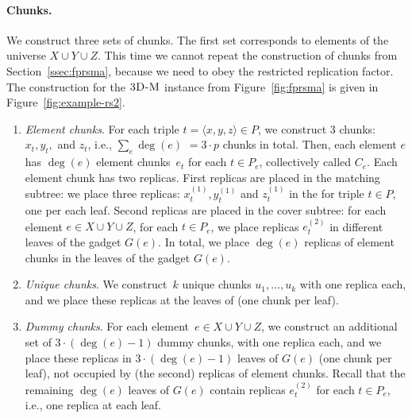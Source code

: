 \paragraph{Chunks.}
We construct three sets of chunks.
The first set corresponds to elements of the universe $X\cup Y\cup Z$.
This time we cannot repeat the construction of chunks from Section~\ref{ssec:fprsma}, because we need to obey the restricted replication factor.
The construction for the $\textsc{3D-M}$ instance from Figure~\ref{fig:fprsma} is given in Figure~\ref{fig:example-rs2}.
\begin{enumerate}
  \item \emph{Element chunks}. For each triple $t = \langle x, y, z \rangle \in P$, we construct $3$ chunks:~$x_t, y_t,$ and $z_t$, i.e., $\sum_e\deg(e)$ $=3\cdot p$ chunks in total.
  Then, each element $e$ has $\deg(e)$ element chunks~$e_t$ for each $t \in P_e$,  collectively called $C_e$.
  Each element chunk has two replicas. First replicas are placed in the matching subtree:
  we place
  three replicas: $x_t^{(1)}, y_t^{(1)}$ and $z_t^{(1)}$ in the {\TripleGadget} for triple $t\in P$, one per each leaf.
  Second replicas are placed in the cover subtree:
  for each element $e \in X\cup Y\cup Z$, for each $t \in P_e$,
  we place replicas $e_t^{(2)}$ in different leaves of the gadget $G(e)$.
  In total, we place $\deg(e)$ replicas of element chunks in the leaves of the gadget $G(e)$.
  \item \emph{Unique chunks}. We construct~$k$ unique chunks $u_1, \ldots, u_k$ with one replica each, and we place these replicas at the leaves of {\UnqGadgets} (one chunk per leaf).
  \item \emph{Dummy chunks}. For each element~$e\in X\cup Y\cup Z$,
  we construct an additional set of $3\cdot(\deg(e) - 1)$ dummy chunks, with one replica each, and we place these replicas in $3\cdot (\deg(e)-1)$ leaves of $G(e)$ (one chunk per leaf),
  not occupied by (the second) replicas of element chunks.
  Recall that the remaining $\deg(e)$ leaves of $G(e)$ contain replicas $e_t^{(2)}$ for each $t \in P_e$, i.e., one replica at each leaf.
\end{enumerate}

